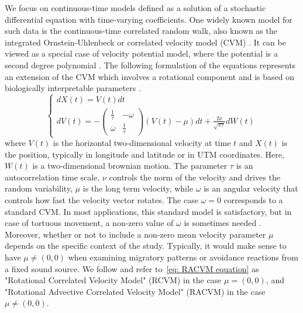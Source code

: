 \documentclass[11pt]{article}
\newcommand {\1}{\mathbb{1}}
\theoremstyle{definition}
\theoremstyle{remark}
\theoremstyle{remark}
\begin{document}
We focus on continuous-time models defined as a solution of a stochastic differential equation with time-varying coefficients. One widely known model for such data is the continuous-time correlated random walk, also known as the integrated Ornstein-Uhlenbeck or correlated velocity model (CVM) \cite{johnson_continuoustime_2008}. It can be viewed as a special case of velocity potential model, where the potential is a second degree polynomial \cite{preisler_analyzing_2013}. The following formulation of the equations represents an extension of the CVM which involves a rotational component and  is based on biologically interpretable parameters \cite{gurarie_correlated_2017}.
\begin{equation} \left\{
	\begin{array}{l}
		dX(t)=V(t)dt \\
		dV(t)=-\begin{pmatrix} 
			\frac{1}{\tau} & -\omega \\
			\omega & \frac{1}{\tau}
		\end{pmatrix}(V(t)-\mu)dt+\frac{2\nu}{\sqrt{\pi \tau}} dW(t) 
	\end{array}
	\right.
	\label{eq: RACVM equation}
\end{equation}
where $V(t)$ is the horizontal two-dimensional velocity at time $t$ and $X(t)$ is the position, typically in longitude and latitude or in UTM coordinates. Here, $W(t)$ is a two-dimensional brownian motion. 
The parameter $\tau$ is an autocorrelation time scale, $\nu$ controls the norm of the velocity and drives the random variability, $\mu$ is the long term velocity, while $\omega$ is an angular velocity that controls how fast the velocity vector rotates. The case $\omega=0$ corresponds to a standard CVM. In most applications, this standard model is satisfactory, but in case of tortuous movement, a non-zero value of $\omega$ is sometimes needed \cite{gurarie_correlated_2017,alt_correlation_1990,albertsen_generalizing_2018}. Moreover, whether or not to include a non-zero mean velocity parameter $\mu$ depends on the specific context of the study. Typically, it would make sense to have $\mu\neq (0,0)$ when examining migratory patterns or avoidance reactions from a fixed sound source. We follow \cite{gurarie_correlated_2017} and refer to~\ref{eq: RACVM equation} as "Rotational Correlated Velocity Model" (RCVM) in the case $\mu=(0,0)$, and "Rotational Advective Correlated Velocity Model" (RACVM) in the case $\mu \neq (0,0)$.\\
\end{document}
